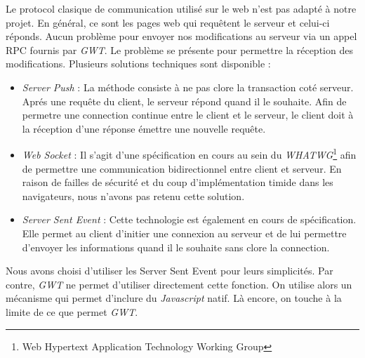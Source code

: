 	Le protocol clasique de communication utilisé sur le web n'est pas 
	adapté à notre projet. En général, ce sont les pages web qui requêtent
	le serveur et celui-ci réponds. Aucun problème pour envoyer nos modifications 
	au serveur via un appel RPC fournis par \emph{GWT}. Le problème se présente
	pour permettre la réception des modifications. Plusieurs solutions 
	techniques sont disponible :
	\begin{itemize}
		\item \emph{Server Push} : La méthode consiste à ne pas clore la
		transaction coté serveur. Aprés une requête du client, le serveur
		répond quand il le souhaite. Afin de permetre une connection continue 
		entre le client et le serveur, le client doit à la réception d'une 
		réponse émettre une nouvelle requête.
		\item \emph{Web Socket}\cite{websocket_spec} : Il s'agit d'une spécification en cours au sein
		du \emph{WHATWG}\footnote{Web Hypertext Application Technology Working 
		Group} afin de permettre une communication bidirectionnel entre client
		et serveur. En raison de failles de sécurité et du coup d'implémentation 
		timide dans les navigateurs, nous n'avons pas retenu cette solution.
		\item \emph{Server Sent Event} \cite{server_sent_spec} 
		\cite{server_sent_html5_rocks} 
		 : Cette technologie est également en
		cours de spécification. Elle permet au client d'initier une connexion
		au serveur et de lui permettre d'envoyer les informations quand il
		le souhaite sans clore la connection.
	\end{itemize}
	
	Nous avons choisi d'utiliser les Server Sent Event pour leurs simplicités.
	Par contre, \emph{GWT} ne permet d'utiliser directement cette fonction.
	On utilise alors un mécanisme qui permet d'inclure du \emph{Javascript} natif.
	Là encore, on touche à la limite de ce que permet \emph{GWT}.
